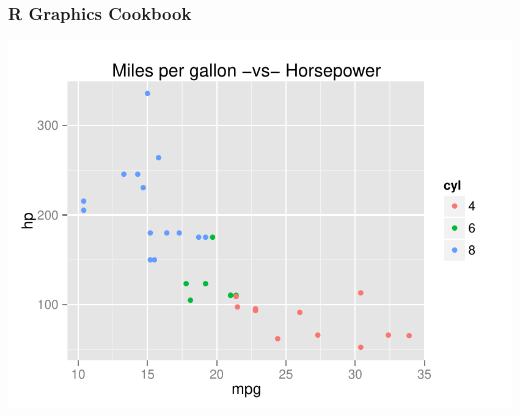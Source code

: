 \documentclass[12pt]{beamer}\usepackage[]{graphicx}\usepackage[]{color}
\newenvironment{knitrout}{}{} %
\begin{document}

\begin{frame}[fragile]
\frametitle{R Graphics Cookbook}
\begin{center}
\end{center}
\end{frame}


\begin{frame}[fragile]
\begin{knitrout}\scriptsize
{}\color{fgcolor}

{\centering \includegraphics[width=.9\linewidth,height=.65\linewidth]{figure/unnamed-chunk-1-1} 

}



\end{knitrout}
\end{frame}

\end{document}
